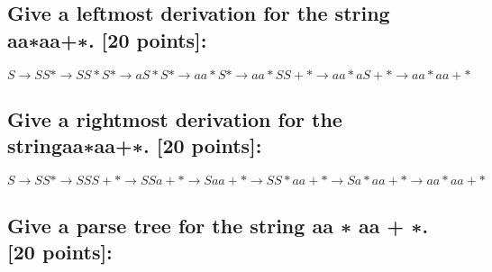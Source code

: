 \documentclass{article}
\begin{document}
        \subsection{Give a leftmost derivation for the string aa∗aa+∗. [20 points]:}
            $$S\rightarrow SS*\rightarrow SS*S*\rightarrow aS*S*\rightarrow aa*S*\rightarrow aa*SS+*\rightarrow aa*aS+*\rightarrow aa*aa+*$$
        \subsection{Give a rightmost derivation for the stringaa∗aa+∗. [20 points]:}
            $$S\rightarrow SS*\rightarrow SSS+*\rightarrow SSa+*\rightarrow Saa+*\rightarrow SS*aa+*\rightarrow Sa*aa+*\rightarrow aa*aa+*$$
        \subsection{ Give a parse tree for the string aa ∗ aa + ∗. [20 points]:}
            
\end{document}
